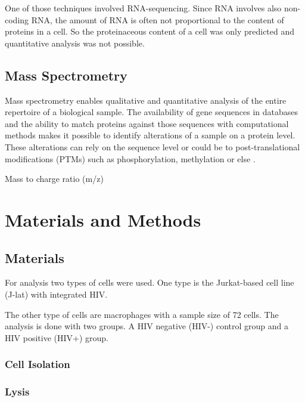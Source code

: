 \documentclass[
  11pt,
]{article}
\begin{document}
One of those techniques involved RNA-sequencing. Since RNA involves also
non-coding RNA, the amount of RNA is often not proportional to the
content of proteins in a cell. So the proteinaceous content of a cell
was only predicted and quantitative analysis was not possible.

\hypertarget{mass-spectrometry}{%
\subsection{Mass Spectrometry}\label{mass-spectrometry}}

Mass spectrometry enables qualitative and quantitative analysis of the
entire repertoire of a biological sample. The availability of gene
sequences in databases and the ability to match proteins against those
sequences with computational methods makes it possible to identify
alterations of a sample on a protein level. These alterations can rely
on the sequence level or could be to post-translational modifications
(PTMs) such as phosphorylation, methylation or else
\citep{Aebersold2003}.

Mass to charge ratio (m/z)


\newpage

\hypertarget{materials-and-methods}{%
\section{Materials and Methods}\label{materials-and-methods}}

\hypertarget{materials}{%
\subsection{Materials}\label{materials}}

For analysis two types of cells were used. One type is the Jurkat-based
cell line (J-lat) with integrated HIV.

The other type of cells are macrophages with a sample size of 72 cells.
The analysis is done with two groups. A HIV negative (HIV-) control
group and a HIV positive (HIV+) group.

\hypertarget{cell-isolation}{%
\subsubsection{Cell Isolation}\label{cell-isolation}}

\hypertarget{lysis}{%
\subsubsection{Lysis}\label{lysis}}
\end{document}

